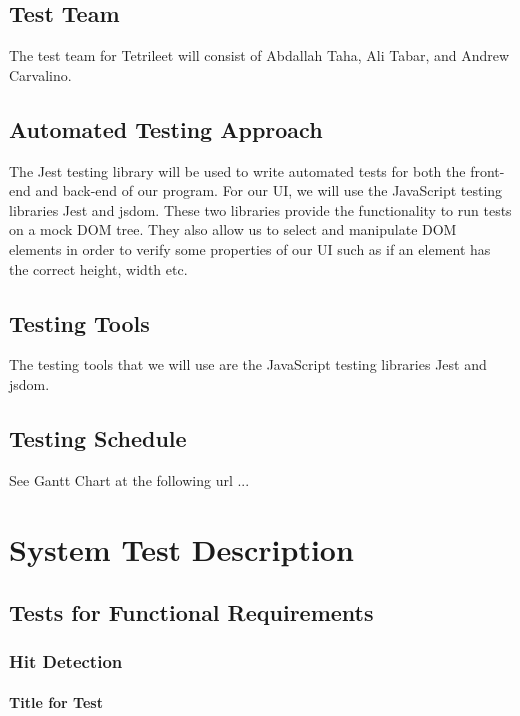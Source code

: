 \documentclass[12pt, titlepage]{article}
\begin{document}
\subsection{Test Team}
The test team for Tetrileet will consist of Abdallah Taha, Ali Tabar, and Andrew Carvalino.

\subsection{Automated Testing Approach}
The Jest testing library will be used to write automated tests for both the front-end and back-end of our program. For our UI, we will use the JavaScript testing libraries Jest and jsdom. These two libraries provide the functionality to run tests on a mock DOM tree. They also allow us to select and manipulate DOM elements in order to verify some properties of our UI such as if an element has the correct height, width etc.

\subsection{Testing Tools}
The testing tools that we will use are the JavaScript testing libraries Jest and jsdom.

\subsection{Testing Schedule}
		
See Gantt Chart at the following url ...

\section{System Test Description}
	
\subsection{Tests for Functional Requirements}

\subsubsection{Hit Detection}
		
\paragraph{Title for Test}
\end{document}

